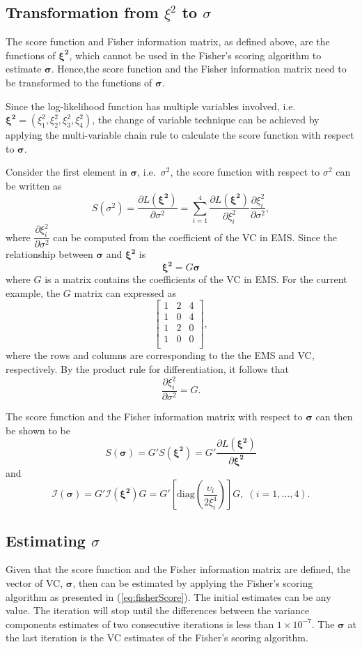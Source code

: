 \documentclass[12pt,a4paper]{article}
\begin{document}
\subsection{Transformation from {\boldmath $\xi^2$} to {\boldmath $\sigma$}}
The score function and Fisher information matrix, as defined above, are the functions of $\bm{\xi^2}$, which cannot be used in the Fisher's scoring algorithm to estimate $\bm{\sigma}$. Hence,the score function and the Fisher information matrix need to be transformed to the functions of $\bm{\sigma}$.
 
Since the log-likelihood function has multiple variables involved, i.e. $\bm{\xi^2} = (\xi_1^2, \xi_2^2,\xi_3^2,\xi_4^2)$, the change of variable technique can be achieved by applying the multi-variable chain rule to calculate the score function with respect to $\bm{\sigma}$.

Consider the first element in $\bm{\sigma}$, i.e.\ $\sigma^2$, the score function with respect to $\sigma^2$ can be written as 
\[S(\sigma^2) =\dfrac{\partial L(\bm{\xi^2})}{\partial \sigma^2} = \sum_{i = 1}^4 \dfrac{\partial L(\bm{\xi^2})}{\partial  \xi_i^2} \dfrac{\partial \xi_i^2}{\partial \sigma^2},  \]
where $\dfrac{\partial \xi_i^2}{\partial \sigma^2}$ can be computed from the coefficient of the VC in EMS. Since the relationship between $\bm{\sigma}$ and $\bm{\xi^2}$ is 
\[\bm{\xi^2} = G \bm{\sigma}\]
where $G$ is a matrix contains the coefficients of the VC in EMS. For the current example, the $G$ matrix can expressed as 
\[\begin{bmatrix}               
1 & 2 & 4\\
1 & 0 & 4\\
1 & 2 & 0\\
1 & 0 & 0\\
\end{bmatrix},\]
where the rows and columns are corresponding to the the EMS and VC, respectively. By the product rule for differentiation, it follows that 
\[\dfrac{\partial \xi_i^2}{\partial \sigma^2} = G.\] 

The score function and the Fisher information matrix with respect to $\bm{\sigma}$ can then be shown to be 
\[S(\bm{\sigma}) = G' S(\bm{\xi^2})= G' \dfrac{\partial L(\bm{\xi^2})}{\partial \bm{\xi^2}}\]
and 
\[\mathcal{I}(\bm{\sigma}) = G' \mathcal{I}(\bm{\xi^2}) G =  G' \left[\mathrm{diag}\left( \dfrac{\upsilon_i }{2\xi_i^4}\right)\right] G, \; (i = 1, \dots, 4).\]

\subsection{Estimating {\boldmath $\sigma$}}
Given that the score function and the Fisher information matrix are defined, the vector of VC, $\bm{\sigma}$, then can be estimated by applying the Fisher's scoring algorithm as presented in (\ref{eq:fisherScore}). The initial estimates can be any value. The iteration will stop until the differences between the variance components estimates of two consecutive iterations is less than $1 \times 10^{-7}$. The $\bm{\sigma}$ at the last iteration is the VC estimates of the Fisher's scoring algorithm.
\end{document}
